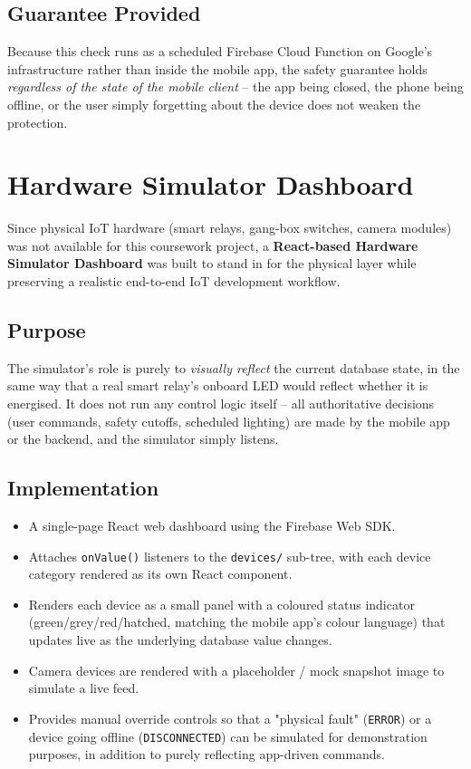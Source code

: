 \documentclass[11pt,a4paper]{article}
\begin{document}
\subsection{Guarantee Provided}
Because this check runs as a scheduled Firebase Cloud Function on Google's infrastructure rather than inside the mobile app, the safety guarantee holds \emph{regardless of the state of the mobile client} -- the app being closed, the phone being offline, or the user simply forgetting about the device does not weaken the protection.

\newpage
\section{Hardware Simulator Dashboard}

Since physical IoT hardware (smart relays, gang-box switches, camera modules) was not available for this coursework project, a \textbf{React-based Hardware Simulator Dashboard} was built to stand in for the physical layer while preserving a realistic end-to-end IoT development workflow.

\subsection{Purpose}
The simulator's role is purely to \emph{visually reflect} the current database state, in the same way that a real smart relay's onboard LED would reflect whether it is energised. It does not run any control logic itself -- all authoritative decisions (user commands, safety cutoffs, scheduled lighting) are made by the mobile app or the backend, and the simulator simply listens.

\subsection{Implementation}
\begin{itemize}
    \item A single-page React web dashboard using the Firebase Web SDK.
    \item Attaches \texttt{onValue()} listeners to the \texttt{devices/} sub-tree, with each device category rendered as its own React component.
    \item Renders each device as a small panel with a coloured status indicator (green/grey/red/hatched, matching the mobile app's colour language) that updates live as the underlying database value changes.
    \item Camera devices are rendered with a placeholder / mock snapshot image to simulate a live feed.
    \item Provides manual override controls so that a "physical fault" (\texttt{ERROR}) or a device going offline (\texttt{DISCONNECTED}) can be simulated for demonstration purposes, in addition to purely reflecting app-driven commands.
\end{itemize}
\end{document}
